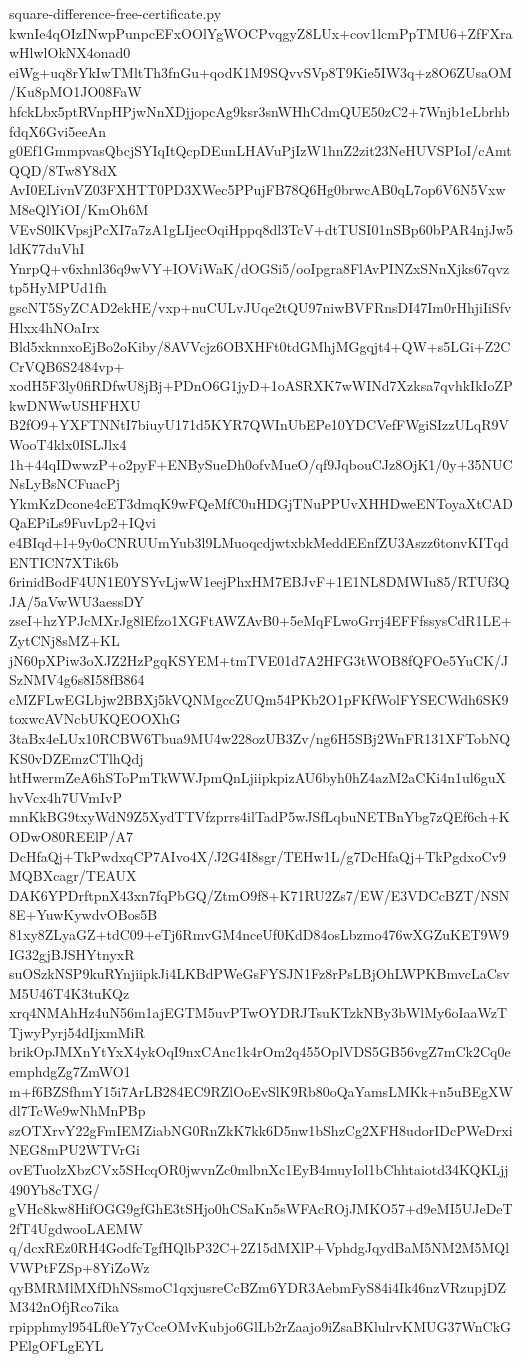 \documentclass[11pt]{article}
\theoremstyle{definition}
\theoremstyle{remark}
\begin{document}
\begin{filecontents*}[overwrite]{square-difference-free-certificate.py}
kwnIe4qOIzINwpPunpcEFxOOlYgWOCPvqgyZ8LUx+cov1lcmPpTMU6+ZfFXrawHlwlOkNX4onad0
eiWg+uq8rYkIwTMltTh3fnGu+qodK1M9SQvvSVp8T9Kie5IW3q+z8O6ZUsaOM/Ku8pMO1JO08FaW
hfckLbx5ptRVnpHPjwNnXDjjopcAg9ksr3snWHhCdmQUE50zC2+7Wnjb1eLbrhbfdqX6Gvi5eeAn
g0Ef1GmmpvasQbcjSYIqItQcpDEunLHAVuPjIzW1hnZ2zit23NeHUVSPIoI/cAmtQQD/8Tw8Y8dX
AvI0ELivnVZ03FXHTT0PD3XWec5PPujFB78Q6Hg0brwcAB0qL7op6V6N5VxwM8eQlYiOI/KmOh6M
VEvS0lKVpsjPcXI7a7zA1gLIjecOqiHppq8dl3TcV+dtTUSI01nSBp60bPAR4njJw5ldK77duVhI
YnrpQ+v6xhnl36q9wVY+IOViWaK/dOGSi5/ooIpgra8FlAvPINZxSNnXjks67qvztp5HyMPUd1fh
gscNT5SyZCAD2ekHE/vxp+nuCULvJUqe2tQU97niwBVFRnsDI47Im0rHhjiIiSfvHlxx4hNOaIrx
Bld5xknnxoEjBo2oKiby/8AVVcjz6OBXHFt0tdGMhjMGgqjt4+QW+s5LGi+Z2CCrVQB6S2484vp+
xodH5F3ly0fiRDfwU8jBj+PDnO6G1jyD+1oASRXK7wWINd7Xzksa7qvhkIkIoZPkwDNWwUSHFHXU
B2fO9+YXFTNNtI7biuyU171d5KYR7QWInUbEPe10YDCVefFWgiSIzzULqR9VWooT4klx0ISLJlx4
1h+44qIDwwzP+o2pyF+ENBySueDh0ofvMueO/qf9JqbouCJz8OjK1/0y+35NUCNsLyBsNCFuacPj
YkmKzDcone4cET3dmqK9wFQeMfC0uHDGjTNuPPUvXHHDweENToyaXtCADQaEPiLs9FuvLp2+IQvi
e4BIqd+l+9y0oCNRUUmYub3l9LMuoqcdjwtxbkMeddEEnfZU3Aszz6tonvKITqdENTICN7XTik6b
6rinidBodF4UN1E0YSYvLjwW1eejPhxHM7EBJvF+1E1NL8DMWIu85/RTUf3QJA/5aVwWU3aessDY
zseI+hzYPJcMXrJg8lEfzo1XGFtAWZAvB0+5eMqFLwoGrrj4EFFfssysCdR1LE+ZytCNj8sMZ+KL
jN60pXPiw3oXJZ2HzPgqKSYEM+tmTVE01d7A2HFG3tWOB8fQFOe5YuCK/JSzNMV4g6s8I58fB864
cMZFLwEGLbjw2BBXj5kVQNMgccZUQm54PKb2O1pFKfWolFYSECWdh6SK9toxwcAVNcbUKQEOOXhG
3taBx4eLUx10RCBW6Tbua9MU4w228ozUB3Zv/ng6H5SBj2WnFR131XFTobNQKS0vDZEmzCTlhQdj
htHwermZeA6hSToPmTkWWJpmQnLjiipkpizAU6byh0hZ4azM2aCKi4n1ul6guXhvVcx4h7UVmIvP
mnKkBG9txyWdN9Z5XydTTVfzprrs4ilTadP5wJSfLqbuNETBnYbg7zQEf6ch+KODwO80REElP/A7
DcHfaQj+TkPwdxqCP7AIvo4X/J2G4I8sgr/TEHw1L/g7DcHfaQj+TkPgdxoCv9MQBXcagr/TEAUX
DAK6YPDrftpnX43xn7fqPbGQ/ZtmO9f8+K71RU2Zs7/EW/E3VDCcBZT/NSN8E+YuwKywdvOBos5B
81xy8ZLyaGZ+tdC09+eTj6RmvGM4nceUf0KdD84osLbzmo476wXGZuKET9W9IG32gjBJSHYtnyxR
suOSzkNSP9kuRYnjiipkJi4LKBdPWeGsFYSJN1Fz8rPsLBjOhLWPKBmvcLaCsvM5U46T4K3tuKQz
xrq4NMAhHz4uN56m1ajEGTM5uvPTwOYDRJTsuKTzkNBy3bWlMy6oIaaWzTTjwyPyrj54dIjxmMiR
brikOpJMXnYtYxX4ykOqI9nxCAnc1k4rOm2q455OplVDS5GB56vgZ7mCk2Cq0eemphdgZg7ZmWO1
m+f6BZSfhmY15i7ArLB284EC9RZlOoEvSlK9Rb80oQaYamsLMKk+n5uBEgXWdl7TcWe9wNhMnPBp
szOTXrvY22gFmIEMZiabNG0RnZkK7kk6D5nw1bShzCg2XFH8udorIDcPWeDrxiNEG8mPU2WTVrGi
ovETuolzXbzCVx5SHcqOR0jwvnZc0mlbnXc1EyB4muyIol1bChhtaiotd34KQKLjj490Yb8cTXG/
gVHc8kw8HifOGG9gfGhE3tSHjo0hCSaKn5sWFAcROjJMKO57+d9eMI5UJeDeT2fT4UgdwooLAEMW
q/dcxREz0RH4GodfcTgfHQlbP32C+2Z15dMXlP+VphdgJqydBaM5NM2M5MQlVWPtFZSp+8YiZoWz
qyBMRMlMXfDhNSsmoC1qxjusreCcBZm6YDR3AebmFyS84i4Ik46nzVRzupjDZM342nOfjRco7ika
rpipphmyl954Lf0eY7yCceOMvKubjo6GlLb2rZaajo9iZsaBKlulrvKMUG37WnCkGPElgOFLgEYL

\end{filecontents*}
\end{document}
